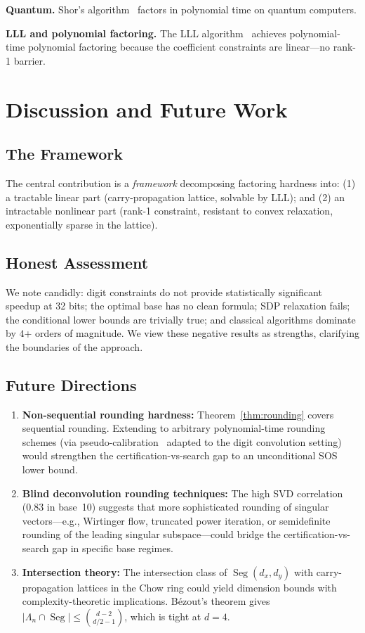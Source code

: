 \documentclass[11pt,a4paper]{article}
\DeclareMathOperator{\Seg}{Seg}
\begin{document}
\textbf{Quantum.} Shor's algorithm~\cite{shor94} factors in polynomial time on quantum computers.

\textbf{LLL and polynomial factoring.} The LLL algorithm~\cite{lll82} achieves polynomial-time polynomial factoring because the coefficient constraints are linear---no rank-1 barrier.

\section{Discussion and Future Work}

\subsection{The Framework}

The central contribution is a \emph{framework} decomposing factoring hardness into: (1) a tractable linear part (carry-propagation lattice, solvable by LLL); and (2) an intractable nonlinear part (rank-1 constraint, resistant to convex relaxation, exponentially sparse in the lattice).

\subsection{Honest Assessment}

We note candidly: digit constraints do not provide statistically significant speedup at 32 bits; the optimal base has no clean formula; SDP relaxation fails; the conditional lower bounds are trivially true; and classical algorithms dominate by $4$+ orders of magnitude. We view these negative results as strengths, clarifying the boundaries of the approach.

\subsection{Future Directions}
\label{sec:future}

\begin{enumerate}[leftmargin=*]
\item \textbf{Non-sequential rounding hardness:} Theorem~\ref{thm:rounding} covers sequential rounding.  Extending to arbitrary polynomial-time rounding schemes (via pseudo-calibration~\cite{barak16} adapted to the digit convolution setting) would strengthen the certification-vs-search gap to an unconditional SOS lower bound.
\item \textbf{Blind deconvolution rounding techniques:} The high SVD correlation (0.83 in base~10) suggests that more sophisticated rounding of singular vectors---e.g., Wirtinger flow, truncated power iteration, or semidefinite rounding of the leading singular subspace---could bridge the certification-vs-search gap in specific base regimes.
\item \textbf{Intersection theory:} The intersection class of $\Seg(d_x, d_y)$ with carry-propagation lattices in the Chow ring could yield dimension bounds with complexity-theoretic implications.  B\'{e}zout's theorem gives $|\Lambda_n \cap \Seg| \le \binom{d{-}2}{d/2{-}1}$, which is tight at $d = 4$.
\end{enumerate}
\end{document}
